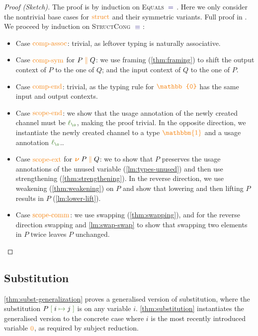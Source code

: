 \documentclass[a4paper,UKenglish,cleveref,autoref,thm-restate,authorcolumns]{lipics-v2019}
\theoremstyle{definition}
\newcommand{\type}[1]{\textcolor{BlueViolet}{\operatorname{#1}}}
\newcommand{\constr}[1]{\textcolor{BurntOrange}{\operatorname{#1}}}
\newcommand{\func}[1]{\textcolor{OliveGreen}{\operatorname{#1}}}
\newcommand{\PO}{\constr{\mathbb{0}}}
\newcommand{\comp}[2]{#1 \; \constr{\parallel} \; #2}
\newcommand{\new}{\constr{\boldsymbol{\nu}} \;}
\newcommand{\unit}{\constr{\mathbbm{1}}}
\newcommand{\subst}[3]{#1 \; \func{[} \; #3 \; \func{\mapsto} \;#2 \; \func{]}}
\newcommand{\lz}{\func{\ell_{\o}}}
\newcommand{\eq}[1]{\; \type{=}_{#1} \;}
\newcommand{\eqeq}{\; \type{\equiv} \;}
\begin{document}
\begin{proof}[Proof (Sketch)]
  The proof is by induction on \textsc{Equals} $\eq{}$.
  Here we only consider the nontrivial base cases for $\constr{struct}$ and their symmetric variants.
  Full proof in \cite{Zalakain2020Agda}.
  We proceed by induction on \textsc{StructCong} $\eqeq$:
  \begin{itemize}
    \item
      Case $\constr{comp-assoc}$: trivial, as leftover typing is naturally associative.
    \item
      Case $\constr{comp-sym}$ for $\comp{P}{Q}$: we use framing (\autoref{thm:framing}) to shift the output context of $P$ to the one of $Q$; and the input context of $Q$ to the one of $P$.
    \item
      Case $\constr{comp-end}$: trivial, as the typing rule for $\PO$ has the same input and output contexts.
    \item
      Case $\constr{scope-end}$: we show that the usage annotation of the newly created channel must be $\lz$, making the proof trivial.
      In the opposite direction, we instantiate the newly created channel to a type $\unit$ and a usage annotation $\lz$..
    \item
      Case $\constr{scope-ext}$ for $\new \comp{P}{Q}$: we to show that $P$ preserves the usage annotations of the unused variable (\autoref{lm:types-unused}) and then use strengthening (\autoref{thm:strengthening}).
      In the reverse direction, we use weakening (\autoref{thm:weakening}) on $P$ and show that lowering and then lifting $P$ results in $P$ (\autoref{lm:lower-lift}).
    \item
      Case $\constr{scope-comm}$:
      we use swapping (\autoref{thm:swapping}), and for the reverse direction swapping and \autoref{lm:swap-swap} to show that swapping two elements in $P$ twice leaves $P$ unchanged. \qedhere
  \end{itemize}
\end{proof}
\subsection{Substitution}
\label{substitution}
\autoref{thm:subst-generalization} proves a generalised version of substitution, where the substitution $\subst{P}{j}{i}$ is on any variable $i$.
\autoref{thm:substitution} instantiates the generalised version to the concrete case where $i$ is the most recently introduced variable $\constr{0}$, as required by subject reduction.
\end{document}
